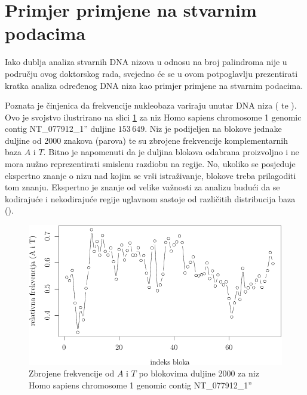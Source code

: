 \section{Primjer primjene na stvarnim podacima}
\label{pal:sec:primjenanastvarnim}

Iako dublja analiza stvarnih DNA nizova u odnosu na broj palindroma
nije u području ovog doktorskog rada, svejedno će se u ovom potpoglavlju prezentirati
kratka analiza određenog DNA niza kao primjer primjene na stvarnim
podacima. 

Poznata je činjenica da frekvencije nukleobaza variraju
unutar DNA niza 
(\textcite{louie_nucleotide_2003} te \textcite{mrazek_strand_1998}).
Ovo je svojstvo
ilustrirano na slici \ref{pal:fig:AT_freq} za niz
{\glqq}Homo sapiens chromosome 1 genomic contig NT\_077912\_1''
\cite{ncbi_database_homosapiens}
duljine $153\, 649$.
Niz je podijeljen na blokove jednake duljine od
2000 znakova (parova) te su zbrojene frekvencije
komplementarnih baza $A$ i $T$.
Bitno je napomenuti da je duljina blokova odabrana proizvoljno
i ne mora nužno reprezentirati smislenu razdiobu na regije.
No, ukoliko se posjeduje ekspertno znanje o nizu nad kojim
se vrši istraživanje, blokove treba prilagoditi tom znanju.
Ekspertno je znanje od velike važnosti za analizu budući
da se kodirajuće i nekodirajuće regije uglavnom sastoje
od različitih distribucija baza 
(\textcite{roy_identification_2009}).

\begin{figure}
\centering
\includegraphics[scale = 1]{poglavlja/palindromi/slike/ATfreq_kromosom_1_blokovi_duljine_2000.pdf}
\caption{Zbrojene frekvencije od $A$ i $T$ po blokovima duljine 2000 za niz
{\glqq}Homo sapiens chromosome 1 genomic contig NT\_077912\_1''
\cite{ncbi_database_homosapiens}}
\label{pal:fig:AT_freq}
\end{figure}


